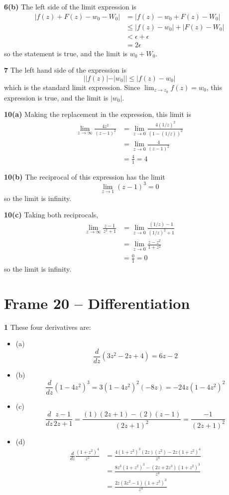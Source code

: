 \documentclass{article}
\begin{document}
\textbf{6(b)}
The left side of the limit expression is
\begin{align*}
	|f(z) + F(z) - w_0 - W_0| &= |f(z) - w_0 + F(z) - W_0| \\
	&\le |f(z) - w_0| + |F(z) - W_0| \\
	&< \epsilon + \epsilon \\
	&= 2\epsilon
\end{align*}
so the statement is true, and the limit is $w_0 + W_0$.

\textbf{7}
The left hand side of the expression is
\[
	| |f(z)| - |w_0|| \le |f(z) - w_0|
\]
which is the standard limit expression. Since $\lim_{z \to z_0} f(z) = w_0$, this expression is true, and the limit is $|w_0|$.

\textbf{10(a)}
Making the replacement in the expression, this limit is
\begin{align*}
	\lim_{z \to \infty} \frac{4z^2}{(z - 1)^2} 
	&= \lim_{z \to 0} \frac{4(1/z)^2}{(1 - (1/z))^2} \\
	&= \lim_{z \to 0} \frac{4}{(z - 1)^2} \\
	&= \frac{4}{1} = 4
\end{align*}

\textbf{10(b)}
The reciprocal of this expression has the limit
\[
	\lim_{z \to 1} (z - 1)^3 = 0
\]
so the limit is infinity.

\textbf{10(c)}
Taking both reciprocals,
\begin{align*}
	\lim_{z \to \infty} \frac{z - 1}{z^2 + 1}
	&= \lim_{z \to 0} \frac{(1/z) - 1}{(1/z)^2 + 1} \\
	&= \lim_{z \to 0} \frac{z - z^2}{1 + z^2} \\
	&= \frac{0}{1} = 0
\end{align*}
so the limit is infinity.


\clearpage
\section{Frame 20 -- Differentiation}
\textbf{1}
These four derivatives are:
\begin{itemize}
	\item{(a)}
	\[
		\frac{d}{dz}(3z^2 - 2z + 4) = 6z - 2
	\]
	
	\item{(b)}
	\[
		\frac{d}{dz}(1 - 4z^2)^3 = 3(1 - 4z^2)^2(-8z) = -24z(1 - 4z^2)^2
	\]
	
	\item{(c)}
	\[
		\frac{d}{dz} \frac{z - 1}{2z + 1} = \frac{(1)(2z + 1) - (2)(z - 1)}{(2z + 1)^2} = \frac{-1}{(2z + 1)^2}
	\]
	
	\item{(d)}
	\begin{align*}
		\frac{d}{dz} \frac{(1 + z^2)^4}{z^2} 
		&= \frac{4(1 + z^2)^3(2z)(z^2) - 2z(1 + z^2)^4}{z^4} \\
		&= \frac{8z^3(1 + z^2)^3 - (2z + 2z^3)(1 + z^2)^3}{z^4} \\
		&= \frac{2z(3z^2 - 1)(1 + z^2)^3}{z^4}
	\end{align*}
\end{itemize}
\end{document}
